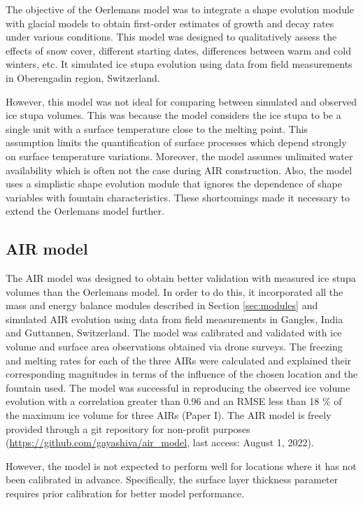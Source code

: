The objective of the Oerlemans model was to integrate a shape evolution module with glacial models to obtain
first-order estimates of growth and decay rates under various conditions. This model was designed to
qualitatively assess the effects of snow cover, different starting dates, differences between warm and cold
winters, etc. It simulated ice stupa evolution using data from field measurements in Oberengadin region,
Switzerland. 

However, this model was not ideal for comparing between simulated and observed ice stupa volumes. This was
because the model considers the ice stupa to be a single unit with a surface temperature close to the melting
point. This assumption limits the quantification of surface processes which depend strongly on surface
temperature variations. Moreover, the model assumes unlimited water availability which is often not the case
during AIR construction. Also, the model uses a simplistic shape evolution module that ignores the dependence of
shape variables with fountain characteristics. These shortcomings made it necessary to extend the Oerlemans
model further.

\subsection{AIR model}

The AIR model was designed to obtain better validation with measured ice stupa volumes than the Oerlemans model.
In order to do this, it incorporated all the mass and energy balance modules described in Section
\ref{sec:modules} and simulated AIR evolution using data from field measurements in Gangles, India and
Guttannen, Switzerland. The model was calibrated and validated with ice volume and surface area observations
obtained via drone surveys. The freezing and melting rates for each of the three \ac{AIRs} were calculated and
explained their corresponding magnitudes in terms of the influence of the chosen location and the fountain used.
The model was successful in reproducing the observed ice volume evolution with a correlation greater than 0.96
and an \ac{RMSE} less than 18 \% of the maximum ice volume for three AIRs (Paper I). The AIR model is freely
provided through a git repository for non-profit purposes (\url{https://github.com/gayashiva/air_model}, last
access: August 1, 2022). 

However, the model is not expected to perform well for locations where it has not been calibrated in advance.
Specifically, the surface layer thickness parameter requires prior calibration for better model performance.

